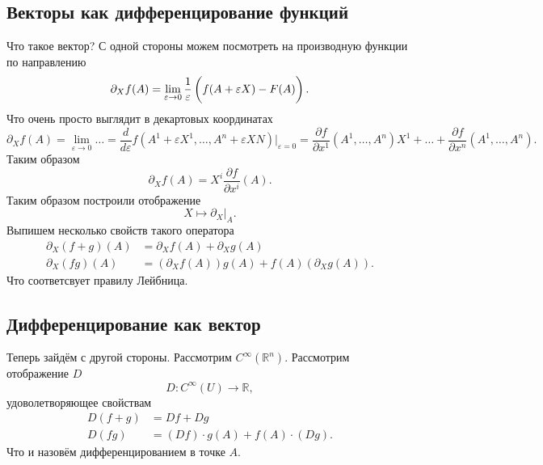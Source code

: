 \subsection{Векторы как дифференцирование функций}

Что такое вектор? С одной стороны можем посмотреть на производную функции по направлению
\begin{equation}
    \partial_{X} f(A) = \lim_{\varepsilon \to 0} \frac{1}{\varepsilon} 
    \left(
        f(A + \varepsilon X) - F(A) \vphantom{\frac{1}{2}}
    \right).
\end{equation}
Что очень просто выглядит в декартовых координатах
$$
    \partial_X f(A) =
    \lim_{\varepsilon \to 0} \ldots =
    \frac{d}{d\varepsilon} f\left(
        A^1 + \varepsilon X^1, \ldots, A^n + \varepsilon XN
    \right) \bigg|_{\varepsilon=0} =
    \frac{\partial f}{\partial x^1} \left(A^1, \ldots, A^n\right) X^1 +
    \ldots +
    \frac{\partial f}{\partial x^n} \left(A^1, \ldots, A^n\right).
$$
Таким образом
\begin{equation}
    \partial_X f(A) = X^i \frac{\partial f}{\partial x^i} (A).
\end{equation}
Таким образом построили отображение
\begin{equation*}
    X \mapsto \partial_X \big|_A.
\end{equation*}
Выпишем несколько свойств такого оператора
\begin{align*}
    \partial_X (f+g)(A) &= \partial_X f(A) + \partial_X g(A) \\
    \partial_X (fg) (A) &=   (\partial_X f(A)) g(A) + f(A) (\partial_X g(A)).
\end{align*}
Что соответсвует правилу Лейбница.

\subsection{Дифференцирование как вектор}

Теперь зайдём с другой стороны. Рассмотрим $C^{\infty} (\mathbb{R}^n)$. Рассмотрим отображение $D$
\begin{equation*}
    D \colon C^\infty (U) \to \mathbb{R},
\end{equation*}
удоволетворяющее свойствам
\begin{align*}
    D(f+g) &= Df + Dg \\
    D(fg) &= (Df) \cdot g(A) + f(A) \cdot (Dg).
\end{align*}
Что и назовём дифференцированием в точке $A$. 


